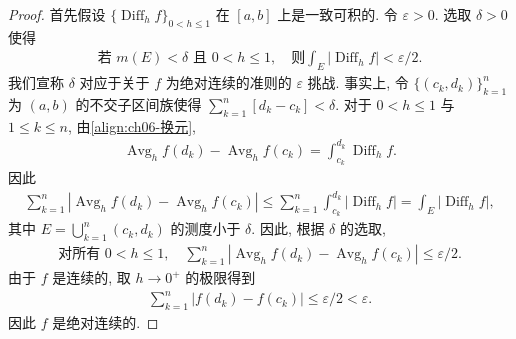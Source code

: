 \documentclass[../../main.tex]{subfiles}
\begin{document}
\begin{proof}
首先假设 $\{\operatorname{Diff}_{h}f\}_{0<h\leqslant 1}$ 在 $[a,b]$ 上是一致可积的. 令 $\varepsilon>0$. 选取 $\delta>0$ 使得
\begin{align*}
\text{若 }m(E)<\delta\text{ 且 }0<h\leqslant 1,\quad\text{则}\int_{E}|\operatorname{Diff}_{h}f|<\varepsilon/2.
\end{align*}
我们宣称 $\delta$ 对应于关于 $f$ 为绝对连续的准则的 $\varepsilon$ 挑战. 事实上, 令 $\{(c_{k},d_{k})\}_{k=1}^{n}$ 为 $(a,b)$ 的不交子区间族使得 $\sum_{k=1}^{n}[d_{k}-c_{k}]<\delta$. 对于 $0<h\leqslant 1$ 与 $1\leqslant k\leqslant n$, 由\eqref{align:ch06-换元},
\begin{align*}
\operatorname{Avg}_{h}f(d_{k})-\operatorname{Avg}_{h}f(c_{k})=\int_{c_{k}}^{d_{k}}\operatorname{Diff}_{h}f.
\end{align*}
因此
\begin{align*}
\sum_{k=1}^{n}|\operatorname{Avg}_{h}f(d_{k})-\operatorname{Avg}_{h}f(c_{k})|\leqslant\sum_{k=1}^{n}\int_{c_{k}}^{d_{k}}|\operatorname{Diff}_{h}f|=\int_{E}|\operatorname{Diff}_{h}f|,
\end{align*}
其中 $E=\bigcup_{k=1}^{n}(c_{k},d_{k})$ 的测度小于 $\delta$. 因此, 根据 $\delta$ 的选取,
\begin{align*}
\text{对所有 }0<h\leqslant 1,\quad\sum_{k=1}^{n}|\operatorname{Avg}_{h}f(d_{k})-\operatorname{Avg}_{h}f(c_{k})|\leqslant\varepsilon/2.
\end{align*}
由于 $f$ 是连续的, 取 $h\to 0^{+}$ 的极限得到
\begin{align*}
\sum_{k=1}^{n}|f(d_{k})-f(c_{k})|\leqslant\varepsilon/2<\varepsilon.
\end{align*}
因此 $f$ 是绝对连续的.


\end{proof}
\end{document}
